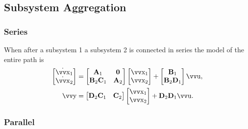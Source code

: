 \subsection{Subsystem Aggregation}

\subsubsection{Series}

When after a subsystem 1 a subsystem 2 is connected in series the model of the entire path is
\begin{align*}
	\begin{bmatrix}
		\dot{\vec{x}}_1 \\ \dot{\vec{x}}_2
	\end{bmatrix}
	&=
	\begin{bmatrix}
			\mx{A}_1 & \mx{0} \\
			\mx{B}_2 \mx{C}_1 & \mx{A}_2 
	\end{bmatrix}
	\begin{bmatrix}
		\vec{x}_1 \\ \vec{x}_2
	\end{bmatrix}
	+
	\begin{bmatrix}
		\mx{B}_1 \\ \mx{B}_2 \mx{D}_1
	\end{bmatrix}
	\vec{u},
	\\
	\vec{y}
	&=
	\begin{bmatrix}
		\mx{D}_2 \mx{C}_1 & \mx{C}_2
	\end{bmatrix}
	\begin{bmatrix}
		\vec{x}_1 \\ \vec{x}_2
	\end{bmatrix}
	+
	\mx{D}_2 \mx{D}_1 \vec{u}.
\end{align*}

\subsubsection{Parallel}

